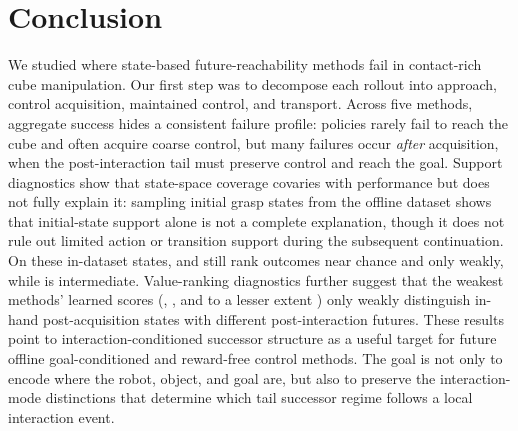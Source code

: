 \section{Conclusion}

We studied where state-based future-reachability methods fail in contact-rich cube manipulation.
Our first step was to decompose each rollout into approach, control acquisition, maintained control, and transport.
Across five methods, aggregate success hides a consistent failure profile: policies rarely fail to reach the cube and often acquire coarse control, but many failures occur \emph{after} acquisition, when the post-interaction tail must preserve control and reach the goal.
Support diagnostics show that state-space coverage covaries with performance but does not fully explain it: sampling initial grasp states from the offline dataset shows that initial-state support alone is not a complete explanation, though it does not rule out limited action or transition support during the subsequent continuation. On these in-dataset states, \rldp{} and \psm{} still rank outcomes near chance and \fb{} only weakly, while \crl{} is intermediate.
Value-ranking diagnostics further suggest that the weakest methods' learned scores (\rldp{}, \psm{}, and to a lesser extent \fb{}) only weakly distinguish
in-hand post-acquisition states with different post-interaction futures.
These results point to interaction-conditioned successor structure as a useful target for future offline goal-conditioned and reward-free control methods.
The goal is not only to encode where the robot, object, and goal are, but also to preserve the interaction-mode distinctions that determine which tail successor regime follows a local interaction event.